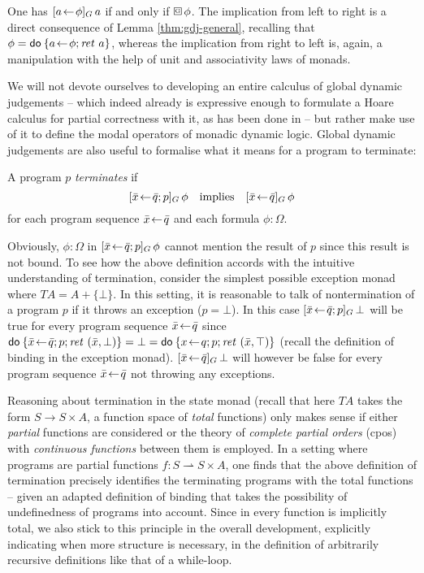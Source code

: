 \begin{cor}
  \label{thm:gdj-gbox-equiv}
  One has $[a\!\gets\! \phi]_G\,a$ if and only if $\gbox \phi$. The implication from
  left to right is a direct consequence of Lemma \ref{thm:gdj-general},
  recalling that $\phi = \mathsf{do}\: \{a \!\gets\! \phi; \mathit{ret}~a\}$, whereas the implication from
  right to left is, again, a manipulation with the help of unit and
  associativity laws of monads.
\end{cor}

We will not devote ourselves to developing an entire calculus of global dynamic
judgements -- which indeed already is expressive enough to formulate a Hoare
calculus for partial correctness with it, as has been done in
\cite{SchroederMossakowski:Hoare} -- but rather make use of it to define the
modal operators of monadic dynamic logic. Global dynamic judgements are also
useful to formalise what it means for a program to terminate:
\begin{defn}
  \label{defn:termination}
  A program $p$ \emph{terminates} if
  \[ [\bar x \!\gets\! \bar q; p]_G\,\phi \quad \text{implies} \quad [\bar x\!\gets\!
    \bar q]_G\,\phi\]
  for each program sequence $\bar x\!\gets\! \bar q$ and each formula $\phi : \Omega$.
\end{defn}
\begin{expl}
  \label{ex:term-except}
  Obviously, $\phi :\Omega$ in $[\bar x\!\gets\! \bar q; p]_G\,\phi$ cannot mention the result
  of $p$ since this result is not bound. To see how the above definition accords
  with the intuitive understanding of termination, consider the simplest
  possible exception monad where $T A = A + \{\bot\}$. In this setting, it is
  reasonable to talk of nontermination of a program $p$ if it throws an
  exception (\IE $p = \bot$). In this case $[\bar x\!\gets\! \bar q; p]_G\,\bot$ will be
  true for every program sequence $\bar x \!\gets\! \bar q$ since $\mathsf{do}\: \{\bar
    x\!\gets\! \bar q; p; \mathit{ret}~(\bar x, \bot)\} = \bot = \mathsf{do}\: \{x\!\gets\! q;p; \mathit{ret}~(\bar x,
      \top)\}$ (recall the definition of binding in the exception monad). $[\bar
        x\!\gets\! \bar q]_G\,\bot$ will however be false for every  program
      sequence $\bar x\!\gets\! \bar q$ not throwing any exceptions.
\end{expl}
\begin{rem}
  Reasoning about termination in the state monad (recall that here $T A$ takes
  the form $S \to S \times A$, \IE a function space of \emph{total} functions) only
  makes sense if either \emph{partial} functions are considered or the theory of
  \emph{complete partial orders} (cpos) with \emph{continuous functions} between
  them is employed. In a setting where programs are partial functions $f : S \rightharpoonup S
  \times A$, one finds that the above definition of termination precisely identifies
  the terminating programs with the total functions -- given an adapted
  definition of binding that takes the possibility of undefinedness of programs
  into account. Since in \IsabelleHOL every function is implicitly total, we
  also stick to this principle in the overall development, explicitly indicating
  when more structure is necessary, \EG in the definition of arbitrarily
  recursive definitions like that of a while-loop.
\end{rem}


